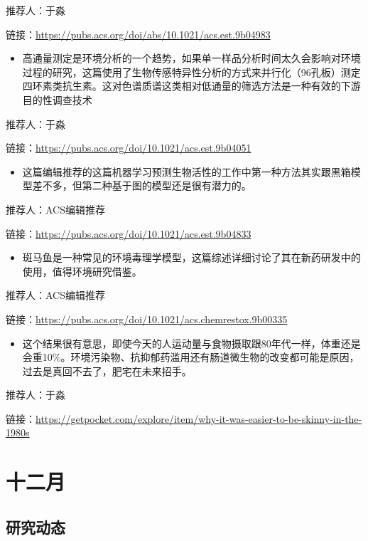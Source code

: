 \documentclass[]{book}
\providecommand{\tightlist}{%
  \setlength{\itemsep}{0pt}\setlength{\parskip}{0pt}}
\begin{document}
推荐人：于淼

链接：\url{https://pubs.acs.org/doi/abs/10.1021/acs.est.9b04983}

\begin{itemize}
\tightlist
\item
  高通量测定是环境分析的一个趋势，如果单一样品分析时间太久会影响对环境过程的研究，这篇使用了生物传感特异性分析的方式来并行化（96孔板）测定四环素类抗生素。这对色谱质谱这类相对低通量的筛选方法是一种有效的下游目的性调查技术
\end{itemize}

推荐人：于淼

链接：\url{https://pubs.acs.org/doi/10.1021/acs.est.9b04051}

\begin{itemize}
\tightlist
\item
  这篇编辑推荐的这篇机器学习预测生物活性的工作中第一种方法其实跟黑箱模型差不多，但第二种基于图的模型还是很有潜力的。
\end{itemize}

推荐人：ACS编辑推荐

链接：\url{https://pubs.acs.org/doi/10.1021/acs.est.9b04833}

\begin{itemize}
\tightlist
\item
  斑马鱼是一种常见的环境毒理学模型，这篇综述详细讨论了其在新药研发中的使用，值得环境研究借鉴。
\end{itemize}

推荐人：ACS编辑推荐

链接：\url{https://pubs.acs.org/doi/10.1021/acs.chemrestox.9b00335}

\begin{itemize}
\tightlist
\item
  这个结果很有意思，即使今天的人运动量与食物摄取跟80年代一样，体重还是会重10\%。环境污染物、抗抑郁药滥用还有肠道微生物的改变都可能是原因，过去是真回不去了，肥宅在未来招手。
\end{itemize}

推荐人：于淼

链接：\url{https://getpocket.com/explore/item/why-it-was-easier-to-be-skinny-in-the-1980s}

\hypertarget{ux5341ux4e8cux6708-2}{%
\section*{十二月}\label{ux5341ux4e8cux6708-2}}

\hypertarget{ux7814ux7a76ux52a8ux6001-25}{%
\subsection*{研究动态}\label{ux7814ux7a76ux52a8ux6001-25}}
\end{document}
